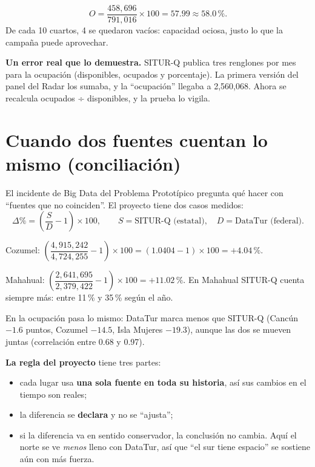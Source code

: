 \begin{amano}
\[
O=\frac{458{,}696}{791{,}016}\times 100 = 57.99 \approx 58.0\,\%.
\]
De cada 10 cuartos, 4 se quedaron vacíos: capacidad ociosa, justo lo que la campaña puede aprovechar.
\end{amano}

\textbf{Un error real que lo demuestra.} SITUR-Q publica tres renglones por mes para la ocupación (disponibles, ocupados
y porcentaje). La primera versión del panel del Radar los sumaba, y la ``ocupación'' llegaba a 2,560,068. Ahora se
recalcula ocupados ÷ disponibles, y la prueba  lo vigila.

\section{Cuando dos fuentes cuentan lo mismo (conciliación)}
El incidente de Big Data del Problema Prototípico pregunta qué hacer con ``fuentes que no coinciden''. El proyecto tiene
dos casos medidos:
\[
\Delta\% = \left(\frac{S}{D}-1\right)\times 100, \qquad S=\text{SITUR-Q (estatal)},\quad D=\text{DataTur (federal)} .
\]

\begin{amano}[ · cruceristas en 2025]
Cozumel: \(\left(\dfrac{4{,}915{,}242}{4{,}724{,}255}-1\right)\times100 = (1.0404-1)\times100 = +4.04\,\%\).

Mahahual: \(\left(\dfrac{2{,}641{,}695}{2{,}379{,}422}-1\right)\times100 = +11.02\,\%\). En Mahahual SITUR-Q cuenta
siempre más: entre 11\,\% y 35\,\% según el año.
\end{amano}

En la ocupación pasa lo mismo: DataTur marca menos que SITUR-Q (Cancún $-1.6$ puntos, Cozumel $-14.5$, Isla Mujeres
$-19.3$), aunque las dos se mueven juntas (correlación entre 0.68 y 0.97).

\textbf{La regla del proyecto} tiene tres partes:
\begin{itemize}
\item cada lugar usa \textbf{una sola fuente en toda su historia}, así sus cambios en el tiempo son reales;
\item la diferencia se \textbf{declara} y no se ``ajusta'';
\item si la diferencia va en sentido conservador, la conclusión no cambia. Aquí el norte se ve \emph{menos} lleno con
  DataTur, así que ``el sur tiene espacio'' se sostiene aún con más fuerza.
\end{itemize}

